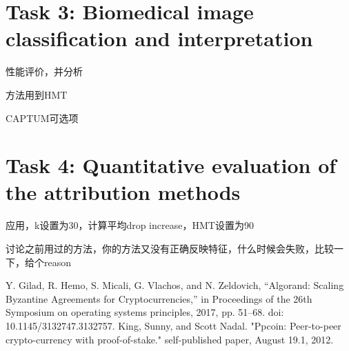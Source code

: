 \documentclass[conference]{IEEEtran}
\begin{document}
\section{Task 3: Biomedical image classification and interpretation}
性能评价，并分析

方法用到HMT

CAPTUM可选项

\section{Task 4: Quantitative evaluation of the attribution methods}
应用，k设置为30，计算平均drop increase，HMT设置为90

讨论之前用过的方法，你的方法又没有正确反映特征，什么时候会失败，比较一下，给个reason


\begin{thebibliography}{00}
Y. Gilad, R. Hemo, S. Micali, G. Vlachos, and N. Zeldovich, “Algorand: Scaling Byzantine Agreements for Cryptocurrencies,” in Proceedings of the 26th Symposium on operating systems principles, 2017, pp. 51–68. doi: 10.1145/3132747.3132757.
 King, Sunny, and Scott Nadal. "Ppcoin: Peer-to-peer crypto-currency with proof-of-stake." self-published paper, August 19.1, 2012.

\end{thebibliography}
\end{document}
